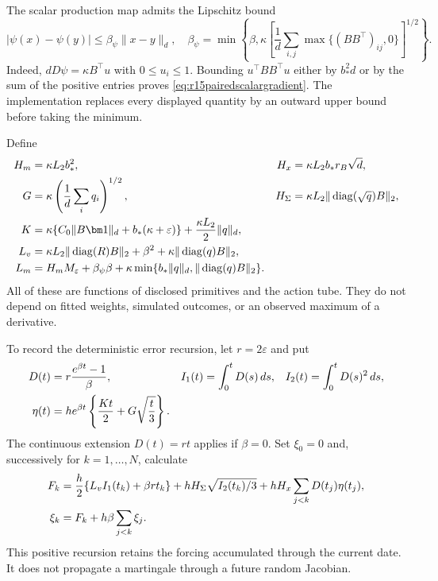 The scalar production map admits the Lipschitz bound
\begin{equation}
 |\psi(x)-\psi(y)|\leq\beta_\psi\|x-y\|_d,
 \quad
 \beta_\psi=
 \min\left\{\beta,
 \kappa\left[\frac1d\sum_{i,j}
                  \max\{(BB^\top)_{ij},0\}\right]^{1/2}\right\}.
 \label{eq:r15pairedscalargradient}
\end{equation}
Indeed, $dD\psi=\kappa B^\top u$ with $0\leq u_i\leq1$.
Bounding $u^\top BB^\top u$ either by $b_*^2d$ or by the sum of
the positive entries proves \eqref{eq:r15pairedscalargradient}.
The implementation replaces every displayed quantity by an outward upper
bound before taking the minimum.

Define
\begin{align}
 H_m&=\kappa L_2 b_*^2,&
 H_x&=\kappa L_2 b_*r_B\sqrt d,\notag\\
 G&=\kappa\left(\frac1d\sum_iq_i\right)^{1/2},&
 H_\Sigma&=\kappa L_2
       \|\operatorname{diag}(\sqrt q)B\|_2,\notag\\
 K&=\kappa\{C_0\|B\bm1\|_d+b_*(\kappa+\varepsilon)\}
                      +\frac{\kappa L_2}{2}\|q\|_d,\notag\\
 L_v&=\kappa L_2\|\operatorname{diag}(R)B\|_2
                         +\beta^2
                         +\kappa\|\operatorname{diag}(q)B\|_2,\notag\\
 L_m&=H_mM_\varepsilon+\beta_\psi\beta
       +\kappa\min\{b_*\|q\|_d,
                         \|\operatorname{diag}(q)B\|_2\}.
 \label{eq:r15pairedcoefficients}
\end{align}
All of these are functions of disclosed primitives and the action tube.
They do not depend on fitted weights, simulated outcomes, or an observed
maximum of a derivative.

To record the deterministic error recursion, let $r=2\varepsilon$ and put
\begin{align}
 D(t)&=r\frac{e^{\beta t}-1}{\beta},&
 I_1(t)&=\int_0^tD(s)\,ds,&
 I_2(t)&=\int_0^tD(s)^2\,ds,\notag\\
 \eta(t)&=he^{\beta t}
            \left\{\frac{Kt}{2}+G\sqrt{\frac t3}\right\}.
 \label{eq:r15pairedauxiliarybounds}
\end{align}
The continuous extension $D(t)=rt$ applies if $\beta=0$.
Set $\xi_0=0$ and, successively for $k=1,\ldots,N$, calculate
\begin{align}
 F_k&=\frac h2\{L_vI_1(t_k)+\beta r t_k\}
            +hH_\Sigma\sqrt{I_2(t_k)/3}
            +hH_x\sum_{j<k}D(t_j)\eta(t_j),\notag\\
 \xi_k&=F_k+h\beta\sum_{j<k}\xi_j.
 \label{eq:r15pairedrecursion}
\end{align}
This positive recursion retains the forcing accumulated through the current
date. It does not propagate a martingale through a future random Jacobian.

